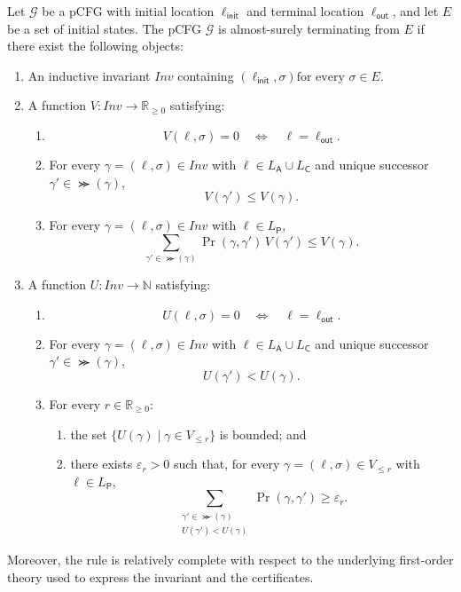 \begin{theorem}
 \label{thm:pcfg-rule}
Let $\mathcal{G}$ be a pCFG with initial location
$\ell_{\mathsf{init}}$ and terminal location
$\ell_{\mathsf{out}}$, and let $E$ be a set of initial states.
The pCFG $\mathcal{G}$ is almost-surely terminating from $E$ if there
exist the following objects:
\begin{enumerate}
 \item An inductive invariant $\mathit{Inv}$ containing $(\ell_{\mathsf{init}},\sigma) \text{for every }\sigma\in E.$

 \item A function
$
  V\colon\mathit{Inv}\to\mathbb{R}_{\geq 0}
$
 satisfying:
 \begin{enumerate}
  \item
  \[
   V(\ell,\sigma)=0
   \quad\Longleftrightarrow\quad
   \ell=\ell_{\mathsf{out}}.
  \]

  \item For every
  $\gamma=(\ell,\sigma)\in\mathit{Inv}$ with
  $\ell\in L_{\mathsf A}\cup L_{\mathsf C}$ and unique successor
  $\gamma'\in\Succ(\gamma)$,
  \[
   V(\gamma')\leq V(\gamma).
  \]

  \item For every
  $\gamma=(\ell,\sigma)\in\mathit{Inv}$ with
  $\ell\in L_{\mathsf P}$,
  \[
   \sum_{\gamma'\in\Succ(\gamma)}
   \Pr(\gamma,\gamma')\,V(\gamma')
   \leq V(\gamma).
  \]
 \end{enumerate}

 \item A function
$
  U\colon\mathit{Inv}\to\mathbb{N}
$
 satisfying:
 \begin{enumerate}
  \item
  \[
   U(\ell,\sigma)=0
   \quad\Longleftrightarrow\quad
   \ell=\ell_{\mathsf{out}}.
  \]

  \item For every
  $\gamma=(\ell,\sigma)\in\mathit{Inv}$ with
  $\ell\in L_{\mathsf A}\cup L_{\mathsf C}$ and unique successor
  $\gamma'\in\Succ(\gamma)$,
  \[
   U(\gamma')<U(\gamma).
  \]

  \item For every $r\in\mathbb{R}_{\geq 0}$:
  \begin{enumerate}
   \item the set
$
    \{U(\gamma)\mid \gamma\in V_{\leq r}\}
$
   is bounded; and

   \item there exists $\varepsilon_r>0$ such that, for every
   $\gamma=(\ell,\sigma)\in V_{\leq r}$ with
   $\ell\in L_{\mathsf P}$,
   \[
    \sum_{\substack{\gamma'\in\Succ(\gamma)\\
                    U(\gamma')<U(\gamma)}}
    \Pr(\gamma,\gamma')
    \geq \varepsilon_r.
   \]
  \end{enumerate}
 \end{enumerate}
\end{enumerate}
Moreover, the rule is relatively complete with respect to the
underlying first-order theory used to express the invariant and the
certificates.
\end{theorem}
